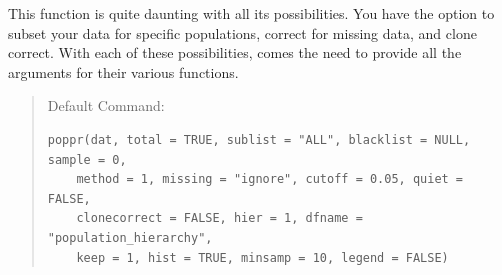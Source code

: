 \documentclass[letterpaper]{article}\usepackage[]{graphicx}\usepackage[]{color}
\makeatletter
\newenvironment{kframe}{%
 \def\at@end@of@kframe{}%
 \ifinner\ifhmode%
  \def\at@end@of@kframe{\end{minipage}}%
  \begin{minipage}{\columnwidth}%
 \fi\fi%
 \def\FrameCommand##1{\hskip\@totalleftmargin \hskip-\fboxsep
 \colorbox{shadecolor}{##1}\hskip-\fboxsep
     \hskip-\linewidth \hskip-\@totalleftmargin \hskip\columnwidth}%
 \MakeFramed {\advance\hsize-\width
   \@totalleftmargin\z@ \linewidth\hsize
   \@setminipage}}%
 {\par\unskip\endMakeFramed%
 \at@end@of@kframe}
\newenvironment{knitrout}{}{} %
\newcommand{\tab}{\hspace*{1em}}
\makeatother
\begin{document}
\tab\tab This function is quite daunting with all its possibilities. You have the option to subset your data for specific populations, correct for missing data, and clone correct. With each of these possibilities, comes the need to provide all the arguments for their various functions.
\begin{quote}
Default Command:
\begin{knitrout}
\color{fgcolor}\begin{kframe}
\begin{verbatim}
poppr(dat, total = TRUE, sublist = "ALL", blacklist = NULL, sample = 0, 
    method = 1, missing = "ignore", cutoff = 0.05, quiet = FALSE, 
    clonecorrect = FALSE, hier = 1, dfname = "population_hierarchy", 
    keep = 1, hist = TRUE, minsamp = 10, legend = FALSE)
\end{verbatim}
\end{kframe}
\end{knitrout}

\end{quote}
\end{document}
